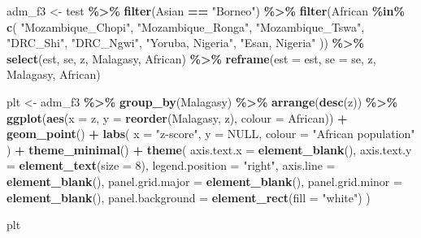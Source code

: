 \documentclass[
]{article}
\newenvironment{Shaded}{\begin{snugshade}}{\end{snugshade}}
\newcommand{\AttributeTok}[1]{\textcolor[rgb]{0.13,0.29,0.53}{#1}}
\newcommand{\ConstantTok}[1]{\textcolor[rgb]{0.56,0.35,0.01}{#1}}
\newcommand{\DecValTok}[1]{\textcolor[rgb]{0.00,0.00,0.81}{#1}}
\newcommand{\FunctionTok}[1]{\textcolor[rgb]{0.13,0.29,0.53}{\textbf{#1}}}
\newcommand{\NormalTok}[1]{#1}
\newcommand{\OtherTok}[1]{\textcolor[rgb]{0.56,0.35,0.01}{#1}}
\newcommand{\SpecialCharTok}[1]{\textcolor[rgb]{0.81,0.36,0.00}{\textbf{#1}}}
\newcommand{\StringTok}[1]{\textcolor[rgb]{0.31,0.60,0.02}{#1}}
\begin{document}
\begin{Shaded}
\begin{Highlighting}[]
\NormalTok{adm\_f3 }\OtherTok{\textless{}{-}}\NormalTok{ test }\SpecialCharTok{\%\textgreater{}\%}
  \FunctionTok{filter}\NormalTok{(Asian }\SpecialCharTok{==} \StringTok{"Borneo"}\NormalTok{) }\SpecialCharTok{\%\textgreater{}\%}
  \FunctionTok{filter}\NormalTok{(African }\SpecialCharTok{\%in\%} \FunctionTok{c}\NormalTok{(}
    \StringTok{"Mozambique\_Chopi"}\NormalTok{, }\StringTok{"Mozambique\_Ronga"}\NormalTok{, }\StringTok{"Mozambique\_Tswa"}\NormalTok{,}
    \StringTok{"DRC\_Shi"}\NormalTok{, }\StringTok{"DRC\_Ngwi"}\NormalTok{, }\StringTok{"Yoruba, Nigeria"}\NormalTok{, }\StringTok{"Esan, Nigeria"}
\NormalTok{  )) }\SpecialCharTok{\%\textgreater{}\%}
  \FunctionTok{select}\NormalTok{(est, se, z, Malagasy, African) }\SpecialCharTok{\%\textgreater{}\%}
  \FunctionTok{reframe}\NormalTok{(}\AttributeTok{est =}\NormalTok{ est, }\AttributeTok{se =}\NormalTok{ se, z, Malagasy, African)}


\NormalTok{plt }\OtherTok{\textless{}{-}}\NormalTok{ adm\_f3 }\SpecialCharTok{\%\textgreater{}\%}
  \FunctionTok{group\_by}\NormalTok{(Malagasy) }\SpecialCharTok{\%\textgreater{}\%}
  \FunctionTok{arrange}\NormalTok{(}\FunctionTok{desc}\NormalTok{(z)) }\SpecialCharTok{\%\textgreater{}\%}
  \FunctionTok{ggplot}\NormalTok{(}\FunctionTok{aes}\NormalTok{(}\AttributeTok{x =}\NormalTok{ z, }\AttributeTok{y =} \FunctionTok{reorder}\NormalTok{(Malagasy, z), }\AttributeTok{colour =}\NormalTok{ African)) }\SpecialCharTok{+}
  \FunctionTok{geom\_point}\NormalTok{() }\SpecialCharTok{+}
  \FunctionTok{labs}\NormalTok{(}
    \AttributeTok{x =} \StringTok{"z{-}score"}\NormalTok{, }\AttributeTok{y =} \ConstantTok{NULL}\NormalTok{,}
    \AttributeTok{colour =} \StringTok{"African population"}
\NormalTok{  ) }\SpecialCharTok{+}
  \FunctionTok{theme\_minimal}\NormalTok{() }\SpecialCharTok{+}
  \FunctionTok{theme}\NormalTok{(}
    \AttributeTok{axis.text.x =} \FunctionTok{element\_blank}\NormalTok{(),}
    \AttributeTok{axis.text.y =} \FunctionTok{element\_text}\NormalTok{(}\AttributeTok{size =} \DecValTok{8}\NormalTok{),}
    \AttributeTok{legend.position =} \StringTok{"right"}\NormalTok{,}
    \AttributeTok{axis.line =} \FunctionTok{element\_blank}\NormalTok{(),}
    \AttributeTok{panel.grid.major =} \FunctionTok{element\_blank}\NormalTok{(),}
    \AttributeTok{panel.grid.minor =} \FunctionTok{element\_blank}\NormalTok{(),}
    \AttributeTok{panel.background =} \FunctionTok{element\_rect}\NormalTok{(}\AttributeTok{fill =} \StringTok{"white"}\NormalTok{)}
\NormalTok{  )}

\NormalTok{plt}
\end{Highlighting}
\end{Shaded}
\end{document}
